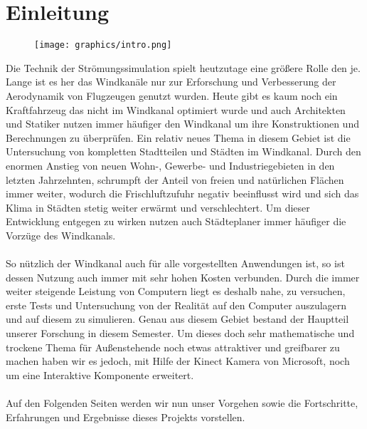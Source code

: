 \chapter{Einleitung}
\begin{Spacing}{\mylinespace}
\begin{figure}[h!]
	\centering
	\texttt{[image: graphics/intro.png]}
	\vspace{20px}
\end{figure}
Die Technik der Strömungssimulation spielt heutzutage eine größere Rolle den je. Lange ist es her das Windkanäle nur zur Erforschung und Verbesserung der Aerodynamik von Flugzeugen genutzt wurden. Heute gibt es kaum noch ein Kraftfahrzeug das nicht im Windkanal optimiert wurde und auch Architekten und Statiker nutzen immer häufiger den Windkanal um ihre Konstruktionen und Berechnungen zu überprüfen. Ein relativ neues Thema in diesem Gebiet ist die Untersuchung von kompletten Stadtteilen und Städten im Windkanal. Durch den enormen Anstieg von neuen Wohn-, Gewerbe- und Industriegebieten in den letzten Jahrzehnten, schrumpft der Anteil von freien und natürlichen Flächen immer weiter, wodurch die Frischluftzufuhr negativ beeinflusst wird und sich das Klima in Städten stetig weiter erwärmt und verschlechtert. Um dieser Entwicklung entgegen zu wirken nutzen auch Städteplaner immer häufiger die Vorzüge des Windkanals.
\\\\
So nützlich der Windkanal auch für alle vorgestellten Anwendungen ist, so ist dessen Nutzung auch immer mit sehr hohen Kosten verbunden. Durch die immer weiter steigende Leistung von Computern liegt es deshalb nahe, zu versuchen, erste Tests und Untersuchung von der Realität auf den Computer auszulagern und auf diesem zu simulieren. Genau aus diesem Gebiet bestand der Hauptteil unserer Forschung in diesem Semester. Um dieses doch sehr mathematische und trockene Thema für Außenstehende noch etwas attraktiver und greifbarer zu machen haben wir es jedoch, mit Hilfe der Kinect Kamera von Microsoft, noch um eine Interaktive Komponente erweitert.
\\\\
Auf den Folgenden Seiten werden wir nun unser Vorgehen sowie die Fortschritte, Erfahrungen und Ergebnisse dieses Projekts vorstellen.
\end{Spacing}
\newpage
\clearpage
